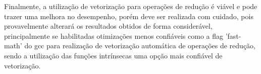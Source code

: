 \documentclass[conference]{IEEEtran}
\begin{document}
Finalmente, a utilização de vetorização para operações de redução é viável e pode trazer uma melhora no desempenho, porém deve ser realizada com cuidado, pois provavelmente alterará os resultados obtidos de forma considerável, principalmente se habilitadas otimizações menos confiáveis como a flag 'fast-math' do gcc para realização de vetorização automática de operações de redução, sendo a utilização das funções intrínsecas uma opção mais confiável de vetorização.



%
%
%
%
%
%
%



% 
% 
\end{document}
